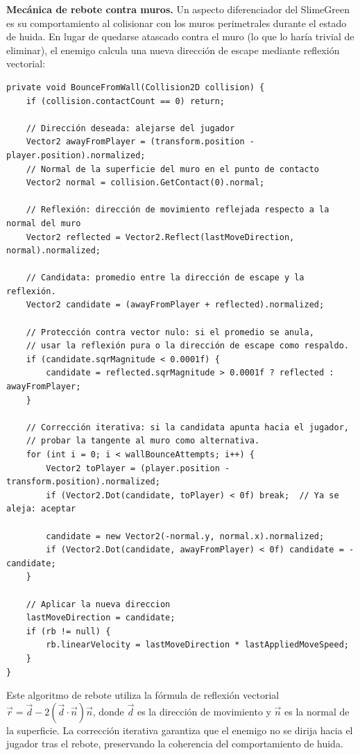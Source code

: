 \textbf{Mecánica de rebote contra muros.} Un aspecto diferenciador del SlimeGreen es su comportamiento al colisionar con los muros perimetrales durante el estado de huida. En lugar de quedarse atascado contra el muro (lo que lo haría trivial de eliminar), el enemigo calcula una nueva dirección de escape mediante reflexión vectorial:

\begin{lstlisting}
private void BounceFromWall(Collision2D collision) {
    if (collision.contactCount == 0) return;
    
    // Dirección deseada: alejarse del jugador
    Vector2 awayFromPlayer = (transform.position - player.position).normalized;
    // Normal de la superficie del muro en el punto de contacto
    Vector2 normal = collision.GetContact(0).normal;
    
    // Reflexión: dirección de movimiento reflejada respecto a la normal del muro
    Vector2 reflected = Vector2.Reflect(lastMoveDirection, normal).normalized;
    
    // Candidata: promedio entre la dirección de escape y la reflexión.
    Vector2 candidate = (awayFromPlayer + reflected).normalized;
    
    // Protección contra vector nulo: si el promedio se anula,
    // usar la reflexión pura o la dirección de escape como respaldo.
    if (candidate.sqrMagnitude < 0.0001f) {
        candidate = reflected.sqrMagnitude > 0.0001f ? reflected : awayFromPlayer;
    }
    
    // Corrección iterativa: si la candidata apunta hacia el jugador,
    // probar la tangente al muro como alternativa.
    for (int i = 0; i < wallBounceAttempts; i++) {
        Vector2 toPlayer = (player.position - transform.position).normalized;
        if (Vector2.Dot(candidate, toPlayer) < 0f) break;  // Ya se aleja: aceptar
        
        candidate = new Vector2(-normal.y, normal.x).normalized;
        if (Vector2.Dot(candidate, awayFromPlayer) < 0f) candidate = -candidate;
    }
    
    // Aplicar la nueva direccion
    lastMoveDirection = candidate;
    if (rb != null) {
        rb.linearVelocity = lastMoveDirection * lastAppliedMoveSpeed;
    }
}
\end{lstlisting}


Este algoritmo de rebote utiliza la fórmula de reflexión vectorial $\vec{r} = \vec{d} - 2(\vec{d} \cdot \vec{n})\vec{n}$, donde $\vec{d}$ es la dirección de movimiento y $\vec{n}$ es la normal de la superficie. La corrección iterativa garantiza que el enemigo no se dirija hacia el jugador tras el rebote, preservando la coherencia del comportamiento de huida.

